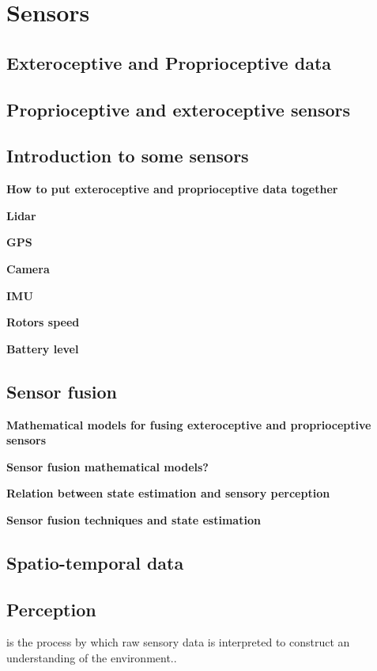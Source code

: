 \chapter{Sensors}

    



\section{Exteroceptive and Proprioceptive data}

\section{Proprioceptive and exteroceptive sensors}
\section{Introduction to some sensors}
    \textbf{How to put exteroceptive and proprioceptive data together}

    \textbf{Lidar} 

    \textbf{GPS}

    \textbf{Camera} 

    \textbf{IMU}

    \textbf{Rotors speed}

    \textbf{Battery level}

\section{Sensor fusion}
    \textbf {Mathematical models for fusing exteroceptive and proprioceptive sensors}

    \textbf{Sensor fusion mathematical models?}

    \textbf{Relation between state estimation and sensory perception}

    \textbf{Sensor fusion techniques and state estimation}

\section{Spatio-temporal data}

\section{Perception}  is the process by which raw sensory data is interpreted to construct an understanding of the environment..

